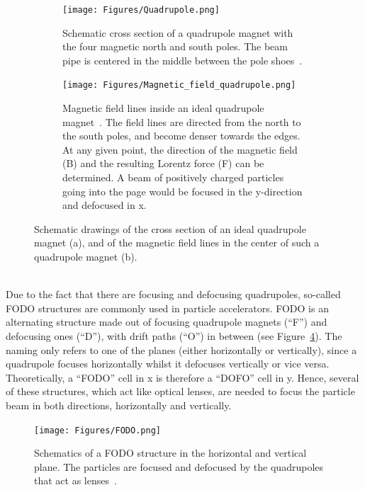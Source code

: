 \begin{figure}
\begin{subfigure}[t]{0.49\textwidth}
\centering
 \texttt{[image: Figures/Quadrupole.png]}
\caption[Cross-section of a quadrupole magnet]{Schematic cross section of a quadrupole magnet with the four magnetic north and south poles.
The beam pipe is centered in the middle between the pole shoes~\cite[p. 88]{Hinterberger}.}
\label{fig:Quadrupole:cross_section}
\end{subfigure}\hfill
\begin{subfigure}[t]{0.49\textwidth}
\centering
 \texttt{[image: Figures/Magnetic\_field\_quadrupole.png]}
\caption[Magnetic field in an ideal quadrupole magnet]{Magnetic field lines inside an ideal quadrupole magnet~\cite{QuadrupoleField}.
The field lines are directed from the north to the south poles, and become denser towards the edges.
At any given point, the direction of the magnetic field (B) and the resulting Lorentz force (F) can be determined.
A beam of positively charged particles going into the page would be focused in the y-direction and defocused in x.}
\label{fig:Quadrupole:field_lines}
\end{subfigure}
\caption[Schematic drawings of a quadrupole magnet]{Schematic drawings of the cross section of an ideal quadrupole magnet (a), and of the magnetic field lines in the center of such a quadrupole magnet (b).}
\label{fig:Quadrupole}
\end{figure}
\\
Due to the fact that there are focusing and defocusing quadrupoles, so-called FODO structures are commonly used in particle accelerators.
FODO is an alternating structure made out of focusing quadrupole magnets (``F'') and defocusing ones (``D''), with drift paths (``O'') in between (see Figure~\ref{fig:FODO}). 
The naming only refers to one of the planes (either horizontally or vertically), since a quadrupole focuses horizontally whilst it defocuses vertically or vice versa.
Theoretically, a ``FODO'' cell in x is therefore a ``DOFO'' cell in y.
Hence, several of these structures, which act like optical lenses, are needed to focus the particle beam in both directions, horizontally and vertically.
\begin{figure}
\centering
\texttt{[image: Figures/FODO.png]}
\caption[Schematic of FODO structure]{Schematics of a FODO structure in the horizontal and vertical plane. The particles are focused and defocused by the quadrupoles that act as lenses~\cite[p. 65]{Hinterberger}.}
\label{fig:FODO}
\end{figure}
